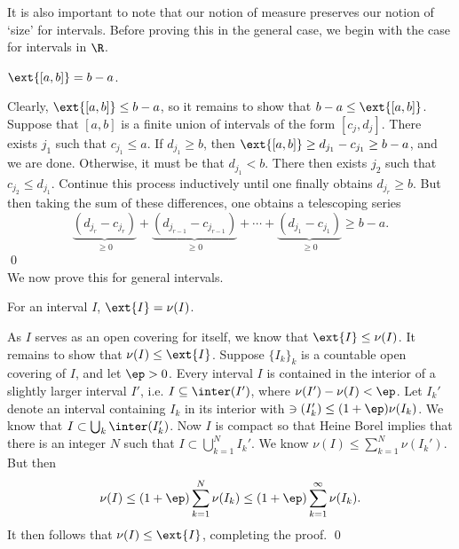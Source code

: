 It is also important to note that our notion of measure preserves our notion of `size' for intervals. Before proving this in the general case, we begin with the case for intervals in $\R$.

\begin{prop}
$\ext{[a,b]}= b-a$. 
\end{prop}

\pf Clearly, $\ext{[a,b]} \leq b-a$, so it remains to show that $b-a \leq \ext{[a,b]}$. Suppose that $[a,b]$ is a finite union of intervals of the form $[c_j,d_j]$. There exists $j_1$ such that $c_{j_1} \leq a$. If $d_{j_1} \geq b$, then $\ext{[a,b]} \geq d_{j_1} - c_{j_1} \geq b-a$, and we are done. Otherwise, it must be that $d_{j_1} < b$. There then exists $j_2$ such that $c_{j_2} \leq d_{j_1}$. Continue this process inductively until one finally obtains $d_{j_r} \geq b$. But then taking the sum of these differences, one obtains a telescoping series
	\[
	\underbrace{(d_{j_{r}} - c_{j_{r}})}_{\geq 0} + \underbrace{(d_{j_{r-1}} - c_{j_{r-1}})}_{\geq 0} + \cdots + \underbrace{(d_{j_{1}} - c_{j_{1}})}_{\geq 0} \geq b-a.
	\]
\qed \\


\noindent We now prove this for general intervals.


\begin{prop} \label{prop:openintmeasure}
For an interval $I$, $\ext{I}= \nu(I)$.
\end{prop}

\pf As $I$ serves as an open covering for itself, we know that $\ext{I} \leq \nu(I)$. It remains to show that $\nu(I) \leq \ext{I}$. Suppose $\{I_k\}_k$ is a countable open covering of $I$, and let $\ep>0$. Every interval $I$ is contained in the interior of a slightly larger interval $I'$, i.e. $I \subseteq \inter(I')$, where $\nu(I')  - \nu(I)<\ep$. Let $I_k'$ denote an interval containing $I_k$ in its interior with $\ni(I_k') \leq (1+\ep)\nu(I_k)$. We know that $I \subset \bigcup_k \inter(I_k')$. Now $I$ is compact so that Heine Borel implies that there is an integer $N$ such that $I \subset \bigcup_{k=1}^N I_k'$. We know $\nu(I) \leq \sum_{k=1}^N \nu(I_k')$. But then
	\[
	\nu(I) \leq (1+\ep) \sum_{k=1}^N \nu(I_k) \leq (1+\ep) \sum_{k=1}^\infty \nu(I_k).
	\]
It then follows that $\nu(I) \leq \ext{I}$, completing the proof. \qed \\

